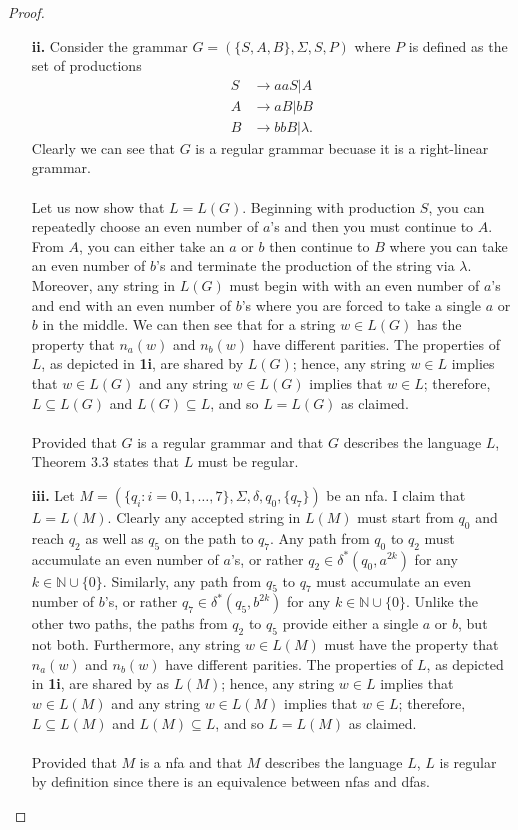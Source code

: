 \documentclass[ 12pt ]{article}
\begin{document}
\begin{enumerate}
\begin{proof}
\begin{enumerate}
				\item[\textbf{ii.}] Consider the grammar $G = (\{ S, A, B \}, \Sigma, S, P)$ where $P$ is defined as the set of productions
					\begin{align*}
						S &\to aaS | A \\
						A &\to aB | bB \\
						B &\to bbB | \lambda.
					\end{align*}
					Clearly we can see that $G$ is a regular grammar becuase it is a right-linear grammar. \\ \\
					Let us now show that $L = L(G)$. Beginning with production $S$, you can repeatedly choose an even number of $a$'s and then you must continue to $A$. From $A$, you can
					either take an $a$ or $b$ then continue to $B$ where you can take an even number of $b$'s and terminate the production of the string via $\lambda$. Moreover, any
					string in $L(G)$ must begin with with an even number of $a$'s and end with an even number of $b$'s where you are forced to take a single $a$ or $b$ in the middle.
					We can then see that for a string $w \in L(G)$ has the property that $n_a(w)$ and $n_b(w)$ have different parities. The properties of $L$, as depicted in \textbf{1i},
					are shared by $L(G)$; hence, any string $w \in L$ implies that $w \in L(G)$ and any string $w \in L(G)$ implies that $w \in L$; therefore, $L \subseteq L(G)$ and
					$L(G) \subseteq L$, and so $L = L(G)$ as claimed. \\ \\
					Provided that $G$ is a regular grammar and that $G$ describes the language $L$, Theorem 3.3 states that $L$ must be regular.

				\item[\textbf{iii.}] Let $M = ( \{ q_i : i = 0, 1, \hdots, 7 \}, \Sigma, \delta, q_0, \{ q_7 \})$ be an nfa. I claim that $L = L(M)$. Clearly any accepted string
					in $L(M)$ must start from $q_0$ and reach $q_2$ as well as $q_5$ on the path to $q_7$. Any path from $q_0$ to $q_2$ must accumulate an even number of $a$'s, or rather
					$q_2 \in \delta^*(q_0, a^{2k})$ for any $k \in \mathbb{N} \cup \{ 0 \}$. Similarly, any path from $q_5$ to $q_7$ must accumulate an even number of $b$'s, or rather
					$q_7 \in \delta^*(q_5, b^{2k})$ for any $k \in \mathbb{N} \cup \{ 0 \}$. Unlike the other two paths, the paths from $q_2$ to $q_5$ provide either a single $a$ or $b$,
					but not both. Furthermore, any string $w \in L(M)$ must have the property that $n_a(w)$ and $n_b(w)$ have different parities. The properties of $L$, as depicted in
					\textbf{1i}, are shared by as $L(M)$; hence, any string $w \in L$ implies that $w \in L(M)$ and any string $w \in L(M)$ implies that $w \in L$; therefore, $L
					\subseteq L(M)$ and $L(M) \subseteq L$, and so $L = L(M)$ as claimed. \\ \\
					Provided that $M$ is a nfa and that $M$ describes the language $L$, $L$ is regular by definition since there is an equivalence between nfas and dfas.
			\end{enumerate}
		\end{proof}



\end{enumerate}
\end{document}
